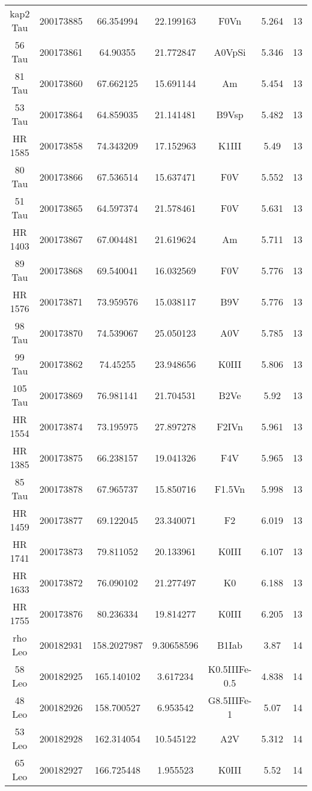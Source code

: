 \begin{table*}
\begin{tabular}{ccccccc}
kap2 Tau & 200173885 & 66.354994 & 22.199163 & F0Vn & 5.264 & 13 \\
56 Tau & 200173861 & 64.90355 & 21.772847 & A0VpSi & 5.346 & 13 \\
81 Tau & 200173860 & 67.662125 & 15.691144 & Am & 5.454 & 13 \\
53 Tau & 200173864 & 64.859035 & 21.141481 & B9Vsp & 5.482 & 13 \\
HR 1585 & 200173858 & 74.343209 & 17.152963 & K1III & 5.49 & 13 \\
80 Tau & 200173866 & 67.536514 & 15.637471 & F0V & 5.552 & 13 \\
51 Tau & 200173865 & 64.597374 & 21.578461 & F0V & 5.631 & 13 \\
HR 1403 & 200173867 & 67.004481 & 21.619624 & Am & 5.711 & 13 \\
89 Tau & 200173868 & 69.540041 & 16.032569 & F0V & 5.776 & 13 \\
HR 1576 & 200173871 & 73.959576 & 15.038117 & B9V & 5.776 & 13 \\
98 Tau & 200173870 & 74.539067 & 25.050123 & A0V & 5.785 & 13 \\
99 Tau & 200173862 & 74.45255 & 23.948656 & K0III & 5.806 & 13 \\
105 Tau & 200173869 & 76.981141 & 21.704531 & B2Ve & 5.92 & 13 \\
HR 1554 & 200173874 & 73.195975 & 27.897278 & F2IVn & 5.961 & 13 \\
HR 1385 & 200173875 & 66.238157 & 19.041326 & F4V & 5.965 & 13 \\
85 Tau & 200173878 & 67.965737 & 15.850716 & F1.5Vn & 5.998 & 13 \\
HR 1459 & 200173877 & 69.122045 & 23.340071 & F2 & 6.019 & 13 \\
HR 1741 & 200173873 & 79.811052 & 20.133961 & K0III & 6.107 & 13 \\
HR 1633 & 200173872 & 76.090102 & 21.277497 & K0 & 6.188 & 13 \\
HR 1755 & 200173876 & 80.236334 & 19.814277 & K0III & 6.205 & 13 \\
rho Leo & 200182931 & 158.2027987 & 9.30658596 & B1Iab & 3.87 & 14 \\
58 Leo & 200182925 & 165.140102 & 3.617234 & K0.5IIIFe-0.5 & 4.838 & 14 \\
48 Leo & 200182926 & 158.700527 & 6.953542 & G8.5IIIFe-1 & 5.07 & 14 \\
53 Leo & 200182928 & 162.314054 & 10.545122 & A2V & 5.312 & 14 \\
65 Leo & 200182927 & 166.725448 & 1.955523 & K0III & 5.52 & 14 \\

\end{tabular}
\end{table*}
